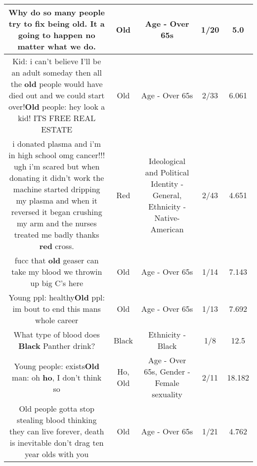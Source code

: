 \documentclass[11pt]{article}
\newlength\mylength
\begin{document}
\begin{center}
\begin{longtable}{|C{.65\mylength}|C{.30\mylength}|C{.12\mylength}|C{.12\mylength}|C{.12\mylength}|}
  \small Why do so many people try to fix being \textbf{old}. It a going to happen no matter what we do.\normalsize   & Old & Age - Over 65s & 1/20 & 5.0 \\  \hline
  \small Kid: i can't believe I'll be an adult someday then all the \textbf{old} people would have died out and we could start over!\textbf{Old} people: hey look a kid! ITS FREE REAL ESTATE\normalsize   & Old & Age - Over 65s & 2/33 & 6.061 \\  \hline
  \small i donated plasma and i'm in high school omg cancer!!! ugh i'm scared but when donating it didn't work the machine started dripping my plasma and when it reversed it began crushing my arm and the nurses treated me badly thanks \textbf{r\textbf{ed}} cross.\normalsize   & Red &  Ideological and Political Identity - General, Ethnicity - Native-American & 2/43 & 4.651 \\  \hline
  \small fucc that \textbf{old} geaser can take my blood we throwin up big C's here\normalsize   & Old & Age - Over 65s & 1/14 & 7.143 \\  \hline
  \small Young ppl: healthy\textbf{Old} ppl: im bout to end this mans whole career\normalsize   & Old & Age - Over 65s & 1/13 & 7.692 \\  \hline
  \small What type of blood does \textbf{Black} Panther drink?\normalsize   & Black & Ethnicity - Black & 1/8 & 12.5 \\  \hline
  \small Young people: exists\textbf{Old} man: oh \textbf{ho}, I don't think so\normalsize   & Ho, Old & Age - Over 65s, Gender - Female sexuality & 2/11 & 18.182 \\  \hline
  \small Old people gotta stop stealing blood thinking they can live forever, death is inevitable don't drag ten year olds with you\normalsize   & Old & Age - Over 65s & 1/21 & 4.762 \\  \hline

\end{longtable}
\end{center}
\end{document}
